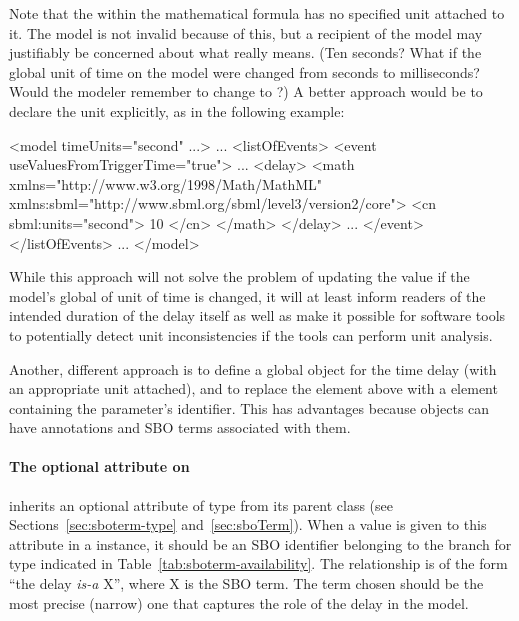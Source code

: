 Note that the  within the mathematical formula
has no specified unit attached to it.  The model is not invalid
because of this, but a recipient of the model may justifiably be
concerned about what  really means.  (Ten seconds?  What
if the global unit of time on the model were changed from seconds
to milliseconds?  Would the modeler remember to change  to
?)  A better approach would be to declare the unit
explicitly, as in the following example:

\vspace*{0.5ex}
\begin{example}
<model timeUnits="second" ...>
    ...
    <listOfEvents>
        <event useValuesFromTriggerTime="true">
            ...
            <delay>
                <math xmlns="http://www.w3.org/1998/Math/MathML"
                      xmlns:sbml="http://www.sbml.org/sbml/level3/version2/core">
                    <cn sbml:units="second"> 10 </cn>
                </math>
            </delay>
            ...
        </event>
    </listOfEvents>
    ...
</model>
\end{example}
\vspace*{0.5ex}

While this approach will not solve the problem of updating the
value if the model's global of unit of time is changed, it will at
least inform readers of the intended duration of the delay itself
as well as make it possible for software tools to potentially
detect unit inconsistencies if the tools can perform unit
analysis.

Another, different approach is to define a global \Parameter
object for the time delay (with an appropriate unit attached), and
to replace the  element above with a  element
containing the parameter's identifier.  This has advantages
because \Parameter objects can have annotations and SBO terms
associated with them.


\paragraph{The optional  attribute on }
\label{sec:delay-sboterm}

\Delay inherits an optional  attribute of type
 from its parent class \SBase (see
Sections~\ref{sec:sboterm-type} and~\ref{sec:sboTerm}).  When a
value is given to this attribute in a \Delay instance, it should
be an SBO identifier belonging to the branch for type \Delay
indicated in Table~\ref{tab:sboterm-availability}.  The
relationship is of the form ``the delay \emph{is-a} X'', where X
is the SBO term.  The term chosen should be the most precise
(narrow) one that captures the role of the delay in the model.

